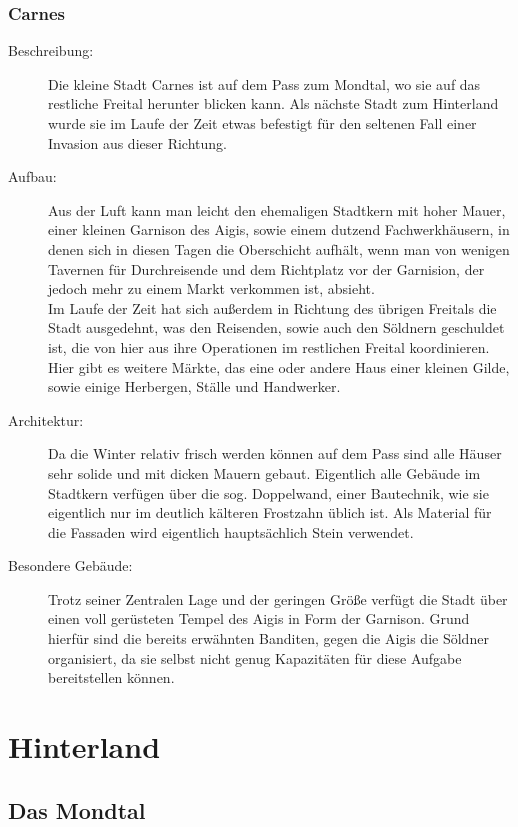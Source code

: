 \documentclass[a4paper,12pt,oneside]{book}
\begin{document}
\subsubsection{Carnes}
\begin{description}
\item[Beschreibung:]Die kleine Stadt Carnes ist auf dem Pass zum Mondtal, wo sie auf das restliche Freital herunter blicken kann. Als nächste Stadt zum Hinterland wurde sie im Laufe der Zeit etwas befestigt für den seltenen Fall einer Invasion aus dieser Richtung.
\item[Aufbau:]Aus der Luft kann man leicht den ehemaligen Stadtkern mit hoher Mauer, einer kleinen Garnison des Aigis, sowie einem dutzend Fachwerkhäusern, in denen sich in diesen Tagen die Oberschicht aufhält, wenn man von wenigen Tavernen für Durchreisende und dem Richtplatz vor der Garnision, der jedoch mehr zu einem Markt verkommen ist, absieht.
\\Im Laufe der Zeit hat sich außerdem in Richtung des übrigen Freitals die Stadt ausgedehnt, was den Reisenden, sowie auch den Söldnern geschuldet ist, die von hier aus ihre Operationen im restlichen Freital koordinieren. Hier gibt es weitere Märkte, das eine oder andere Haus einer kleinen Gilde, sowie einige Herbergen, Ställe und Handwerker.
\item[Architektur:]Da die Winter relativ frisch werden können auf dem Pass sind alle Häuser sehr solide und mit dicken Mauern gebaut. Eigentlich alle Gebäude im Stadtkern verfügen über die sog. Doppelwand, einer Bautechnik, wie sie eigentlich nur im deutlich kälteren Frostzahn üblich ist. Als Material für die Fassaden wird eigentlich hauptsächlich Stein verwendet.
\item[Besondere Gebäude:]Trotz seiner Zentralen Lage und der geringen Größe verfügt die Stadt über einen voll gerüsteten Tempel des Aigis in Form der Garnison. Grund hierfür sind die bereits erwähnten Banditen, gegen die Aigis die Söldner organisiert, da sie selbst nicht genug Kapazitäten für diese Aufgabe bereitstellen können.
\end{description}

\section{Hinterland}

\subsection{Das Mondtal}
\end{document}
